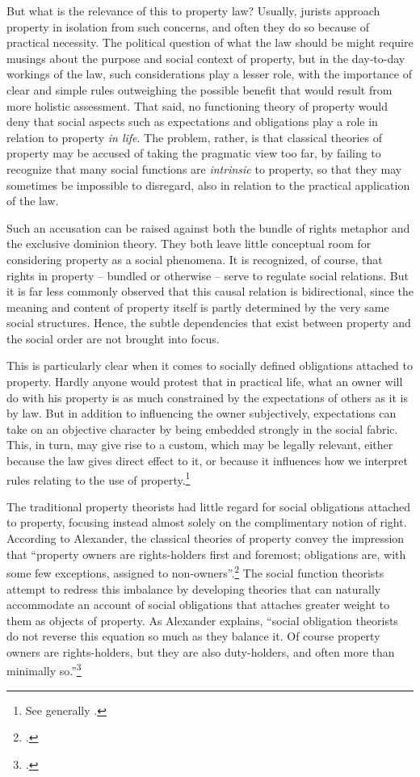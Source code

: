 But what is the relevance of this to property law? Usually, jurists approach property in isolation from such concerns, and often they do so because of practical necessity. The political question of what the law should be might require musings about the purpose and social context of property, but in the day-to-day workings of the law, such considerations play a lesser role, with the importance of clear and simple rules outweighing the possible benefit that would result from more holistic assessment. That said, no functioning theory of  property would deny that social aspects such as expectations and obligations play a role in relation to property {\it in life}. The problem, rather, is that classical theories of property may be accused of taking the pragmatic view too far, by failing to recognize that many social functions are {\it intrinsic} to property, so that they may sometimes be impossible to disregard, also in relation to the practical application of the law.

Such an accusation can be raised against both the bundle of rights metaphor and the exclusive dominion theory. They both leave little conceptual room for considering property as a social phenomena. It is recognized, of course, that rights in property -- bundled or otherwise -- serve to regulate social relations. But it is far less commonly observed that this causal relation is bidirectional, since the meaning and content of property itself is partly determined by the very same social structures. Hence, the subtle dependencies that exist between property and the social order are not brought into focus.

This is particularly clear when it comes to socially defined obligations attached to property. Hardly anyone would protest that in practical life, what an owner will do with his property is as much constrained by the expectations of others as it is by law. But in addition to influencing the owner subjectively, expectations can take on an objective character by being embedded strongly in the social fabric. This, in turn, may give rise to a custom, which may be legally relevant, either because the law gives direct effect to it, or because it influences how we interpret rules relating to the use of property.\footnote{See generally \cite{penalver09,alexander09}.}

The traditional property theorists had little regard for social obligations attached to property, focusing instead almost solely on the complimentary notion of right. According to Alexander, the classical theories of property convey the impression that ``property owners are rights-holders first and foremost; obligations are, with some few exceptions, assigned to non-owners''.\footcite[1023]{alexander11} The social function theorists attempt to redress this imbalance by developing theories that can naturally accommodate an account of social obligations that attaches greater weight to them as objects of property. As Alexander explains, ``social obligation theorists do not reverse this equation so much as they balance it. Of course property owners are rights-holders, but they are also duty-holders, and often more than minimally so.''\footcite[1023]{alexander11} 

